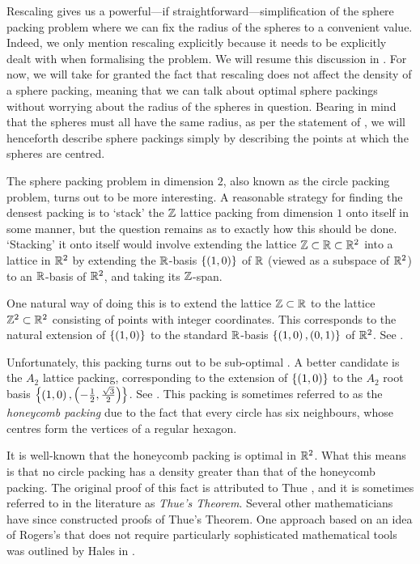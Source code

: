 Rescaling gives us a powerful---if straightforward---simplification of the sphere packing problem where we can fix the radius of the spheres to a convenient value. Indeed, we only mention rescaling explicitly because it needs to be explicitly dealt with when formalising the problem. We will resume this discussion in . For now, we will take for granted the fact that rescaling does not affect the density of a sphere packing, meaning that we can talk about optimal sphere packings without worrying about the radius of the spheres in question. Bearing in mind that the spheres must all have the same radius, as per the statement of , we will henceforth describe sphere packings simply by describing the points at which the spheres are centred.

The sphere packing problem in dimension $2$, also known as the circle packing problem, turns out to be more interesting. A reasonable strategy for finding the densest packing is to `stack' the $\mathbb{Z}$ lattice packing from dimension $1$ onto itself in some manner, but the question remains as to exactly how this should be done. `Stacking' it onto itself would involve extending the lattice $\mathbb{Z} \subset \mathbb{R} \subset \mathbb{R}^2$ into a lattice in $\mathbb{R}^2$ by extending the $\mathbb{R}$-basis $\left\{ \left( 1, 0 \right) \right\}$ of $\mathbb{R}$ (viewed as a subspace of $\mathbb{R}^2$) to an $\mathbb{R}$-basis of $\mathbb{R}^2$, and taking its $\mathbb{Z}$-span.

One natural way of doing this is to extend the lattice $\mathbb{Z} \subset \mathbb{R}$ to the lattice $\mathbb{Z}^2 \subset \mathbb{R}^2$ consisting of points with integer coordinates. This corresponds to the natural extension of $\left\{ \left( 1, 0 \right) \right\}$ to the standard $\mathbb{R}$-basis $\left\{ \left( 1, 0 \right), \left( 0, 1 \right) \right\}$ of $\mathbb{R}^2$. See .

Unfortunately, this packing turns out to be sub-optimal . A better candidate is the $A_2$ lattice packing, corresponding to the extension of $\left\{ \left( 1, 0 \right) \right\}$ to the $A_2$ root basis $\left\{ \left( 1, 0 \right), \left( -\frac{1}{2}, \frac{\sqrt{3}}{2} \right) \right\}$. See . This packing is sometimes referred to as the \textit{honeycomb packing} due to the fact that every circle has six neighbours, whose centres form the vertices of a regular hexagon.

It is well-known that the honeycomb packing is optimal in $\mathbb{R}^2$. What this means is that no circle packing has a density greater than that of the honeycomb packing. The original proof of this fact is attributed to Thue \cite{Thue}, and it is sometimes referred to in the literature as \textit{Thue's Theorem}. Several other mathematicians have since constructed proofs of Thue's Theorem. One approach based on an idea of Rogers's that does not require particularly sophisticated mathematical tools was outlined by Hales in \cite{CannonHoney}.

